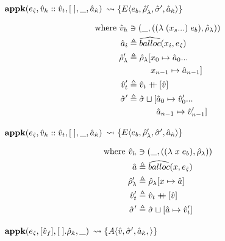 \documentclass[12pt,draft]{article}
\newcommand\mdoubleplus{\ensuremath{\mathbin{+\mkern-9mu+}}}
\newcommand{\lamsyn}[2]{(\lambda\;(#1 ...)\;#2)}
\newcommand{\vararglamsyn}[2]{(\lambda\;#1\;#2)}
\newcommand{\E}[4]{E\langle #1 , #2 , #3 , #4 \rangle}
\newcommand{\A}[4]{A\langle #1 , #2 , #3 , #4 \rangle}
\begin{document}
\begin{multicols*}{2}
\vfill\null
\columnbreak


\begin{center}
  $\textbf{appk}(e_{\hat{\varsigma}}, \hat{v}_h::\hat{v}_t , [\;] , \_ , \hat{a}_{\hat{\kappa}})$
  $\leadsto \{\E{e_b}{\aenv_{\lambda}'}{\astore'}{\akaddr}\}$
\end{center}
\vspace{-7mm}
\begin{align*}
  \text{where }
  \aval_h &\ni (\_ , (\lamsyn{x_s}{e_b} , \aenv_{\lambda})) \\
  \abaddr_i &\triangleq \aballoc{x_i , \ectrl}\\
  \aenv_{\lambda}' &\triangleq \aenv_{\lambda}[x_0 \mapsto \abaddr_0 ... \\
          &\;\;\;\;\;\;\;\;\;\,x_{n-1} \mapsto \abaddr_{n-1}] \\
  \aval_t' &\triangleq \aval_t \mdoubleplus [\aval] \\
  \astore' &\triangleq \astore \sqcup [\abaddr_0 \mapsto \aval_0' ... \\
          &\;\;\;\;\;\;\;\;\;\;\;\;\abaddr_{n-1} \mapsto \aval_{n-1}']
\end{align*}
\begin{center}
  $\textbf{appk}(e_{\hat{\varsigma}}, \hat{v}_h::\hat{v}_t , [\;] , \_ , \hat{a}_{\hat{\kappa}})$
  $\leadsto \{\E{e_b}{\aenv_{\lambda}'}{\astore'}{\akaddr}\}$
\end{center}
\vspace{-7mm}
\begin{align*}
  \text{where }
  \aval_h &\ni (\_ , (\vararglamsyn{x}{e_b} , \aenv_{\lambda})) \\
  \abaddr &\triangleq \aballoc{x , \ectrl} \\
  \aenv_{\lambda}' &\triangleq \aenv_{\lambda}[x \mapsto \abaddr] \\
  \aval_t' &\triangleq \aval_t \mdoubleplus [\aval] \\
  \astore' &\triangleq \astore \sqcup [\abaddr \mapsto \aval_t']
\end{align*}
\begin{center}
  $\textbf{appk}(e_{\hat{\varsigma}} , [\hat{v}_f] , [\;] . \hat{\rho}_{\hat{\kappa}} , \_)$
  $\leadsto \{\A{\aval}{\astore'}{\akaddr}{}\}$
\end{center}

\end{multicols*}
\end{document}
